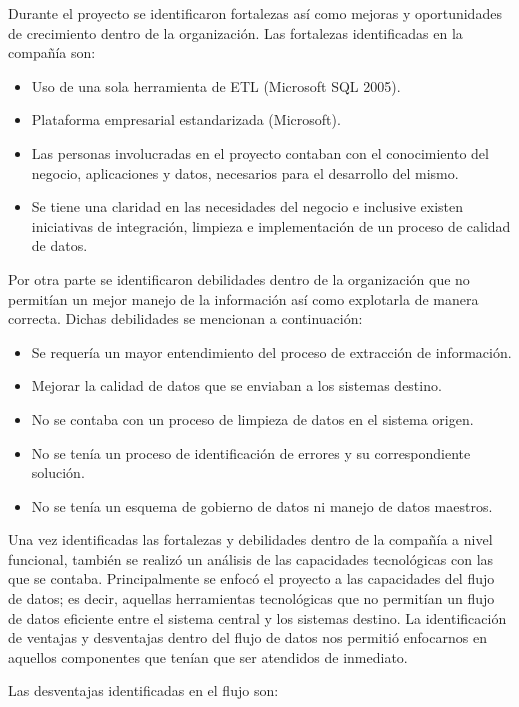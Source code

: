 Durante el proyecto se identificaron fortalezas así como mejoras y oportunidades
de crecimiento dentro de la organización. Las fortalezas identificadas en la
compañía son:

\begin{itemize}
\item Uso de una sola herramienta de ETL (Microsoft SQL 2005).
\item Plataforma empresarial estandarizada (Microsoft).
\item Las personas involucradas en el proyecto contaban con el conocimiento del
  negocio, aplicaciones y datos, necesarios para el desarrollo del mismo.
\item Se tiene una claridad en las necesidades del negocio e inclusive existen
  iniciativas de integración, limpieza e implementación de un proceso de calidad
  de datos.
\end{itemize}

Por otra parte se identificaron debilidades dentro de la organización que no
permitían un mejor manejo de la información así como explotarla de manera
correcta. Dichas debilidades se mencionan a continuación:

\begin{itemize}
\item Se requería un mayor entendimiento del proceso de extracción de
  información.
\item Mejorar la calidad de datos que se enviaban a los sistemas destino.
\item No se contaba con un proceso de limpieza de datos en el sistema origen.
\item No se tenía un proceso de identificación de errores y su correspondiente
  solución.
\item No se tenía un esquema de gobierno de datos ni manejo de datos maestros.
\end{itemize}

Una vez identificadas las fortalezas y debilidades dentro de la compañía a nivel
funcional, también se realizó un análisis de las capacidades tecnológicas con
las que se contaba. Principalmente se enfocó el proyecto a las capacidades del
flujo de datos; es decir, aquellas herramientas tecnológicas que no permitían un
flujo de datos eficiente entre el sistema central y los sistemas destino. La
identificación de ventajas y desventajas dentro del flujo de datos nos permitió
enfocarnos en aquellos componentes que tenían que ser atendidos de inmediato.

Las desventajas identificadas en el flujo son:

